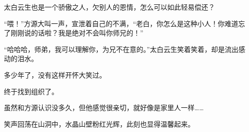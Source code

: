 \begin{this_body}
太白云生也是一个骄傲之人，欠别人的恩情，怎么可以如此轻易偿还？

“喂！”方源大叫一声，宣泄着自己的不满，“老白，你怎么是这种小人！你难道忘了刚刚说的话啦？我是绝对不会叫你师兄的！”

“哈哈哈，师弟，我可以理解你，为兄不在意的。”太白云生笑着笑着，却是流出感动的泪水。

多少年了，没有这样开怀大笑过。

终于找到组织了。

虽然和方源认识没多久，但他感觉很亲切，就好像是家里人一样……

笑声回荡在山洞中，水晶山壁粉红光辉，此刻也显得温馨起来。

\end{this_body}

